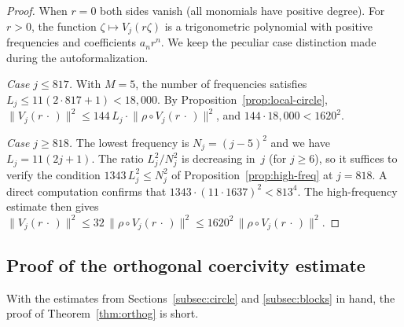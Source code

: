 \documentclass[11pt]{amsart}
\theoremstyle{remark}
\begin{document}
\begin{proof}
When $r = 0$ both sides vanish (all monomials have positive degree).
For $r > 0$, the function $\zeta \mapsto V_j(r\zeta)$ is a trigonometric
polynomial with positive frequencies and coefficients $a_n r^n$. We keep the peculiar case distinction made during the autoformalization.
\medskip

\smallskip\noindent
\emph{Case $j \le 817$.}\;
With $M = 5$, the number of frequencies satisfies $L_j \le 11(2 \cdot 817 + 1)
< 18{,}000$.  By Proposition~\ref{prop:local-circle},
$\lVert V_j(r\,\cdot\,) \rVert^2 \le 144\, L_j \cdot
\lVert \rho \circ V_j(r\,\cdot\,) \rVert^2$, and
$144 \cdot 18{,}000 < 1620^2$.
\medskip

\smallskip\noindent
\emph{Case $j \ge 818$.}\;
The lowest frequency is $N_j = (j{-}5)^2$ and we have
$L_j = 11(2j{+}1)$.  The ratio $L_j^2/N_j^2$ is decreasing in~$j$
(for $j \ge 6$), so it suffices to verify the condition
$1343\,L_j^2 \le N_j^2$ of Proposition~\ref{prop:high-freq} at $j = 818$.
A direct computation confirms that $1343 \cdot (11 \cdot 1637)^2 < 813^4$.
The high-frequency estimate then gives
$\lVert V_j(r\,\cdot\,) \rVert^2 \le 32\,\lVert \rho \circ V_j(r\,\cdot\,) \rVert^2
\le 1620^2\,\lVert \rho \circ V_j(r\,\cdot\,) \rVert^2$.
\end{proof} 
\subsection{Proof of the orthogonal coercivity estimate}\label{subsec:assembly} With the estimates from Sections~\ref{subsec:circle} and \ref{subsec:blocks} in hand, the proof of
Theorem~\ref{thm:orthog} is short.
\end{document}
